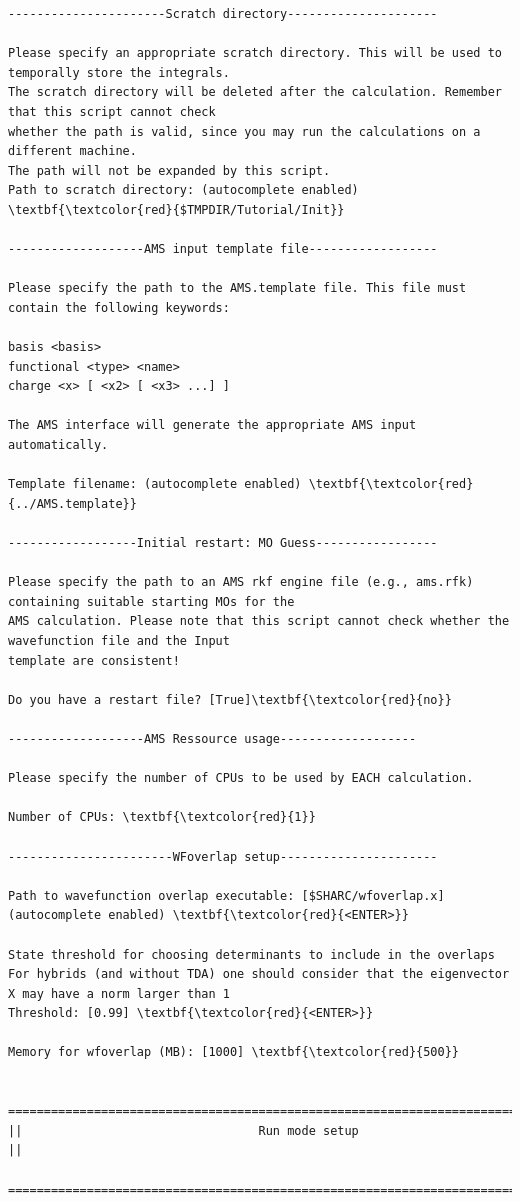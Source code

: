 \documentclass[a4paper,11pt,DIV=15,openany]{scrbook}
\begin{document}
\begin{oframed}
\begin{Verbatim}[commandchars=\\\{\}]
----------------------Scratch directory---------------------

Please specify an appropriate scratch directory. This will be used to temporally store the integrals. 
The scratch directory will be deleted after the calculation. Remember that this script cannot check 
whether the path is valid, since you may run the calculations on a different machine. 
The path will not be expanded by this script.
Path to scratch directory: (autocomplete enabled) \textbf{\textcolor{red}{$TMPDIR/Tutorial/Init}}

-------------------AMS input template file------------------

Please specify the path to the AMS.template file. This file must contain the following keywords:

basis <basis>
functional <type> <name>
charge <x> [ <x2> [ <x3> ...] ]

The AMS interface will generate the appropriate AMS input automatically.

Template filename: (autocomplete enabled) \textbf{\textcolor{red}{../AMS.template}}

------------------Initial restart: MO Guess-----------------

Please specify the path to an AMS rkf engine file (e.g., ams.rfk) containing suitable starting MOs for the 
AMS calculation. Please note that this script cannot check whether the wavefunction file and the Input 
template are consistent!

Do you have a restart file? [True]\textbf{\textcolor{red}{no}} 

-------------------AMS Ressource usage-------------------

Please specify the number of CPUs to be used by EACH calculation.

Number of CPUs: \textbf{\textcolor{red}{1}}

-----------------------WFoverlap setup----------------------

Path to wavefunction overlap executable: [$SHARC/wfoverlap.x] (autocomplete enabled) \textbf{\textcolor{red}{<ENTER>}}

State threshold for choosing determinants to include in the overlaps
For hybrids (and without TDA) one should consider that the eigenvector X may have a norm larger than 1
Threshold: [0.99] \textbf{\textcolor{red}{<ENTER>}} 

Memory for wfoverlap (MB): [1000] \textbf{\textcolor{red}{500}}

  ================================================================================
||                                 Run mode setup                                 ||
  ================================================================================



\end{Verbatim}
\end{oframed}
\end{document}
